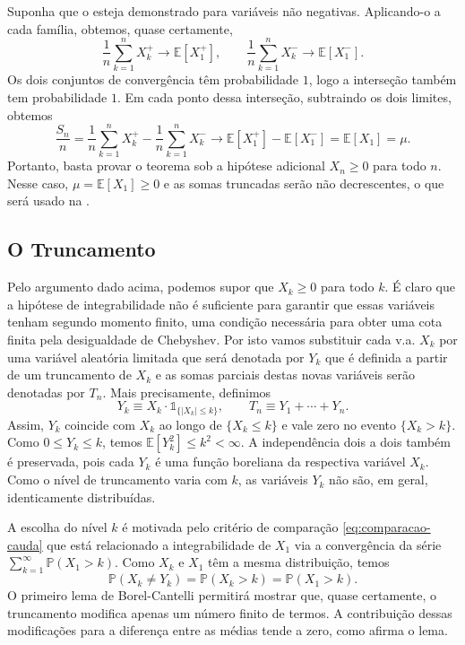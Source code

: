 \documentclass[12pt,portuguese]{article}
\theoremstyle{definition}
\theoremstyle{plainexercise}
\theoremstyle{starredexercise}
\theoremstyle{definition}
\begin{document}
Suponha que o  esteja demonstrado para variáveis não
negativas. Aplicando-o a cada família, obtemos, quase certamente,
\[
\frac{1}{n}\sum_{k=1}^{n}X_k^+\longrightarrow\mathbb{E}[X_1^+],
\qquad
\frac{1}{n}\sum_{k=1}^{n}X_k^-\longrightarrow\mathbb{E}[X_1^-].
\]
Os dois conjuntos de convergência têm probabilidade $1$, logo a interseção
também tem probabilidade $1$. Em cada ponto dessa interseção, subtraindo os dois limites, obtemos
\[
\frac{S_n}{n}
=
\frac{1}{n}\sum_{k=1}^{n}X_k^+
-
\frac{1}{n}\sum_{k=1}^{n}X_k^-
\longrightarrow
\mathbb{E}[X_1^+]-\mathbb{E}[X_1^-]
=
\mathbb{E}[X_1]
=
\mu.
\]
Portanto, basta provar o teorema sob a hipótese adicional $X_n\geqslant0$ para
todo $n$. Nesse caso, $\mu=\mathbb{E}[X_1]\geqslant0$ e as somas truncadas
serão não decrescentes, o que será usado na .

\subsection{O Truncamento}\label{subsec:lema-truncamento}

Pelo argumento dado acima, podemos supor que $X_k\geqslant0$ para
todo $k$. É claro que a hipótese de integrabilidade não é suficiente para garantir que essas variáveis
tenham segundo momento finito, uma condição necessária para obter uma cota
finita pela desigualdade de Chebyshev. Por isto vamos substituir cada v.a.
$X_k$ por uma variável aleatória limitada que será denotada por $Y_k$
que é definida a partir de um truncamento de $X_k$ e as somas
parciais destas novas variáveis serão denotadas por $T_n$. Mais precisamente, definimos
\begin{equation}\label{eq:truncamento}
Y_k\equiv X_k\cdot \mathds{1}_{\{|X_k|\leqslant k\}},
\qquad
T_n\equiv Y_1+\cdots+Y_n.
\end{equation}
Assim, $Y_k$ coincide com $X_k$ ao longo de $\{X_k\leqslant k\}$ e vale zero
no evento $\{X_k>k\}$. Como $0\leqslant Y_k\leqslant k$, temos
$\mathbb{E}[Y_k^2]\leqslant k^2<\infty$. A independência dois a dois também
é preservada, pois cada $Y_k$ é uma função boreliana da respectiva variável
$X_k$. Como o nível de truncamento varia com $k$, as variáveis $Y_k$ não
são, em geral, identicamente distribuídas.

A escolha do nível $k$ é motivada pelo critério de comparação
\eqref{eq:comparacao-cauda} que está relacionado a integrabilidade de $X_1$ via a convergência
da série $\sum_{k=1}^{\infty}\mathbb{P}(X_1>k)$. Como $X_k$ e $X_1$ têm a
mesma distribuição, temos
\[
\mathbb{P}(X_k\neq Y_k)
=\mathbb{P}(X_k>k)
=\mathbb{P}(X_1>k).
\]
O primeiro lema de Borel-Cantelli
permitirá mostrar que, quase certamente, o truncamento modifica apenas um
número finito de termos. A contribuição dessas modificações para a
diferença entre as médias tende a zero, como afirma o lema.
\end{document}
